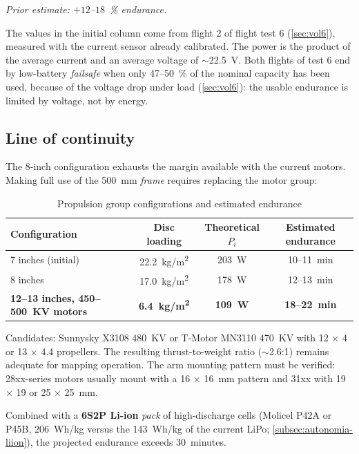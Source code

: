 \noindent\textit{Prior estimate: $+12$--$18$~\% endurance.}

\smallskip
\noindent The values in the initial column come from flight 2 of flight test 6 (\cref{sec:vol6}), measured with the current sensor already calibrated. The power is the product of the average current and an average voltage of $\sim$22.5~V. Both flights of test 6 end by low-battery \emph{failsafe} when only 47--50~\% of the nominal capacity has been used, because of the voltage drop under load (\cref{sec:vol6}): the usable endurance is limited by voltage, not by energy.

\subsection{Line of continuity}
\label{subsec:propulsor-continuitat}

The 8-inch configuration exhausts the margin available with the current motors. Making full use of the 500~mm \emph{frame} requires replacing the motor group:

\begin{table}[H]
    \centering
    \caption{Propulsion group configurations and estimated endurance}
    \label{tab:continuitat-propulsor}
    \small
    \begin{tabular}{lccc}
        \toprule
        Configuration & Disc loading & Theoretical $P_i$ & Estimated endurance \\
        \midrule
        7 inches (initial) & 22.2~kg/m\textsuperscript{2} & 203~W & 10--11~min \\
        8 inches & 17.0~kg/m\textsuperscript{2} & 178~W & 12--13~min \\
        \textbf{12--13 inches, 450--500~KV motors} & \textbf{6.4~kg/m\textsuperscript{2}} & \textbf{109~W} & \textbf{18--22~min} \\
        \bottomrule
    \end{tabular}
\end{table}

Candidates: Sunnysky X3108 480~KV or T-Motor MN3110 470~KV with 12 $\times$ 4 or 13 $\times$ 4.4 propellers. The resulting thrust-to-weight ratio ($\sim$2.6:1) remains adequate for mapping operation. The arm mounting pattern must be verified: 28xx-series motors usually mount with a 16 $\times$ 16~mm pattern and 31xx with 19 $\times$ 19 or 25 $\times$ 25~mm.

Combined with a \textbf{6S2P Li-ion} \emph{pack} of high-discharge cells (Molicel P42A or P45B, 206~Wh/kg versus the 143~Wh/kg of the current LiPo; \cref{subsec:autonomia-liion}), the projected endurance exceeds 30~minutes.

